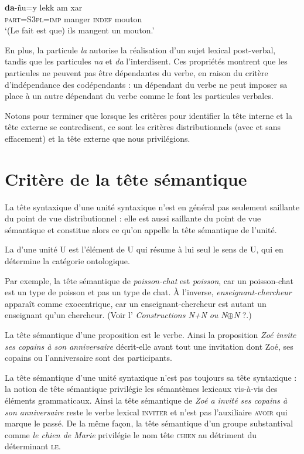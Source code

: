 \ea
\gll \textbf{{da}}{{}-ñu=y              lekk         am      xar~}\\
\textsc{part=S3pl=imp} manger  \textsc{indef}  mouton\\
\glt `(Le fait est que) ils mangent un mouton.’
\z

En plus, la particule \textit{la} autorise la réalisation d’un sujet lexical post-verbal, tandis que les particules \textit{na} et \textit{da} l’interdisent. Ces propriétés montrent que les particules ne peuvent pas être dépendantes du verbe, en raison du critère d’indépendance des codépendants : un dépendant du verbe ne peut imposer sa place à un autre dépendant du verbe comme le font les particules verbales.

Notons pour terminer que lorsque les critères pour identifier la tête interne et la tête externe se contredisent, ce sont les critères distributionnels (avec et sans effacement) et la tête externe que nous privilégions.

\section{Critère de la tête sémantique}\label{sec:3.3.17}

La tête syntaxique d’une unité syntaxique n’est en général pas seulement saillante du point de vue distributionnel : elle est aussi saillante du point de vue sémantique et constitue alors ce qu’on appelle la tête sémantique de l’unité.

\begin{styleLivreImportant}
La  d’une unité U est l’élément de U qui résume à lui seul le sens de U, qui en détermine la catégorie ontologique.
\end{styleLivreImportant}

Par exemple, la tête sémantique de \textit{poisson-chat} est \textit{poisson}, car un poisson-chat est un type de poisson et pas un type de chat. À l’inverse, \textit{enseignant-chercheur} apparaît comme exocentrique, car un enseignant-chercheur est autant un enseignant qu’un chercheur. (Voir l’ \textit{Constructions N+N} \textit{ou N}${\oplus}$\textit{N} ?.)

La tête sémantique d’une proposition est le verbe. Ainsi la proposition \textit{Zoé invite ses copains à son anniversaire} décrit-elle avant tout une invitation dont Zoé, ses copains ou l’anniversaire sont des participants.

La tête sémantique d’une unité syntaxique n’est pas toujours sa tête syntaxique : la notion de tête sémantique privilégie les sémantèmes lexicaux vis-à-vis des éléments grammaticaux. Ainsi la tête sémantique de \textit{Zoé a invité ses copains à son anniversaire} reste le verbe lexical \textsc{inviter} et n’est pas l’auxiliaire \textsc{avoir} qui marque le passé. De la même façon, la tête sémantique d’un groupe substantival comme \textit{le chien de Marie} privilégie le nom tête \textsc{chien} au détriment du déterminant \textsc{le}.

